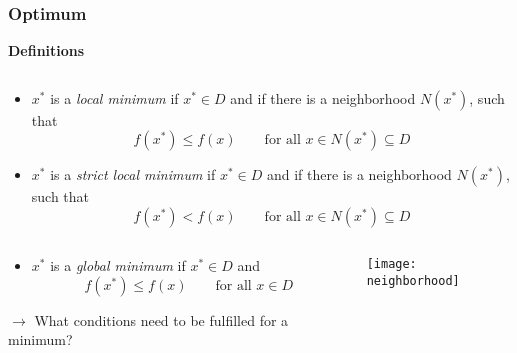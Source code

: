 \documentclass[%
  final,
  11pt, 
  show notes, %
  t, %
  fleqn, %
]{beamer}
\begin{document}
\begin{frame}
  \frametitle{Optimum}
\textbf{Definitions}
\begin{columns}[T]
\begin{column}{\textwidth}
\begin{itemize}
\item $x^\ast$ is a \emph{local minimum} if $x^\ast \in D$ and if there is a neighborhood $N(x^\ast)$, such that
\begin{equation*}
f(x^\ast) \leq f(x) \qquad \text{for all } x \in N(x^\ast) \subseteq D
\end{equation*}
\item $x^\ast$ is a \emph{strict local minimum} if $x^\ast \in D$ and if there is a neighborhood $N(x^\ast)$, such that
\begin{equation*}
f(x^\ast) < f(x) \qquad \text{for all } x \in N(x^\ast) \subseteq D
\end{equation*}
\end{itemize}
\end{column}
\end{columns}

\begin{columns}[T]
\begin{column}{.75\textwidth}
\begin{itemize}
\item $x^\ast$ is a \emph{global minimum} if $x^\ast \in D$ and
\begin{equation*}
f(x^\ast) \leq f(x) \qquad \text{for all } x \in D
\end{equation*}
\end{itemize}

$\rightarrow$ What conditions need to be fulfilled for a minimum?
\end{column}
\begin{column}{.25\textwidth}
\hspace*{-0.5cm}\texttt{[image: neighborhood]}
\end{column}
\end{columns}
\end{frame}
\end{document}
